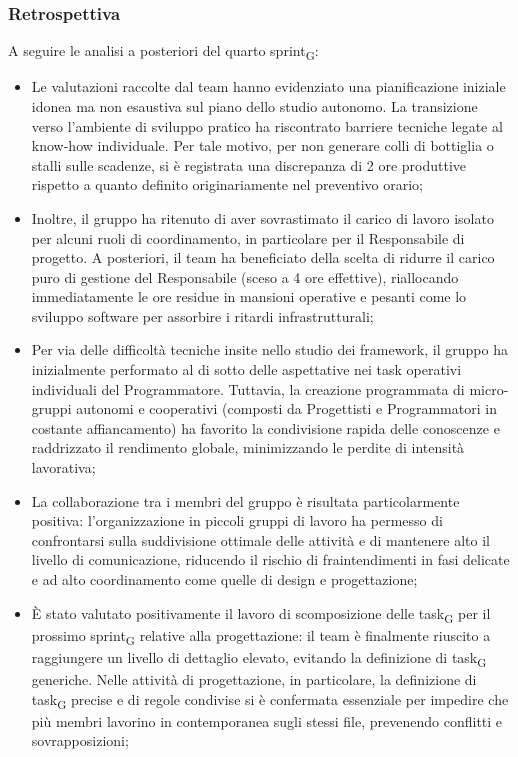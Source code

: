 \documentclass[a4paper, 10pt, colorlinks=true, linkcolor=black, urlcolor=blue, citecolor=blue, hidelinks]{article}
\begin{document}
\subsubsection{Retrospettiva}
A seguire le analisi a posteriori del quarto sprint\textsubscript{G}:
\begin{itemize}
    \item Le valutazioni raccolte dal team hanno evidenziato una pianificazione iniziale idonea ma non esaustiva sul piano dello studio autonomo. La transizione verso l'ambiente di sviluppo pratico ha riscontrato barriere tecniche legate al know-how individuale. Per tale motivo, per non generare colli di bottiglia o stalli sulle scadenze, si è registrata una discrepanza di 2 ore produttive rispetto a quanto definito originariamente nel preventivo orario;
    \item Inoltre, il gruppo ha ritenuto di aver sovrastimato il carico di lavoro isolato per alcuni ruoli di coordinamento, in particolare per il Responsabile di progetto. A posteriori, il team ha beneficiato della scelta di ridurre il carico puro di gestione del Responsabile (sceso a 4 ore effettive), riallocando immediatamente le ore residue in mansioni operative e pesanti come lo sviluppo software per assorbire i ritardi infrastrutturali;
    \item Per via delle difficoltà tecniche insite nello studio dei framework, il gruppo ha inizialmente performato al di sotto delle aspettative nei task operativi individuali del Programmatore. Tuttavia, la creazione programmata di micro-gruppi autonomi e cooperativi (composti da Progettisti e Programmatori in costante affiancamento) ha favorito la condivisione rapida delle conoscenze e raddrizzato il rendimento globale, minimizzando le perdite di intensità lavorativa;
    \item La collaborazione tra i membri del gruppo è risultata particolarmente positiva: l'organizzazione in piccoli gruppi di lavoro ha permesso di confrontarsi sulla suddivisione ottimale delle attività e di mantenere alto il livello di comunicazione, riducendo il rischio di fraintendimenti in fasi delicate e ad alto coordinamento come quelle di design e progettazione;
    \item È stato valutato positivamente il lavoro di scomposizione delle task\textsubscript{G} per il prossimo sprint\textsubscript{G} relative alla progettazione: il team è finalmente riuscito a raggiungere un livello di dettaglio elevato, evitando la definizione di task\textsubscript{G} generiche. Nelle attività di progettazione, in particolare, la definizione di task\textsubscript{G} precise e di regole condivise si è confermata essenziale per impedire che più membri lavorino in contemporanea sugli stessi file, prevenendo conflitti e sovrapposizioni;

\end{itemize}
\end{document}

